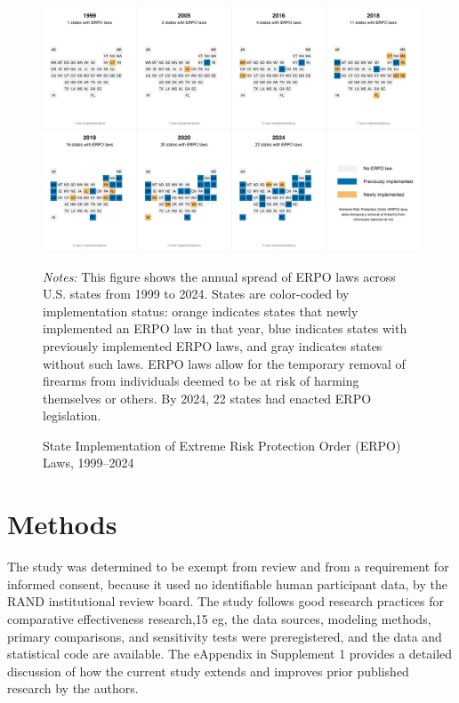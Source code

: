 \documentclass[,ijds,nonblindrev]{informs}
\begin{document}
\begin{figure}[t] 
\centering
\includegraphics[width=\textwidth]{../erpo_laws_spread.png}
\caption{State Implementation of Extreme Risk Protection Order (ERPO) Laws, 1999–2024}  
\label{fig:erpo_map}
\begin{tablenotes}
\item \footnotesize{\textit{Notes:} This figure shows the annual spread of ERPO laws across U.S. states from 1999 to 2024. States are color-coded by implementation status: orange indicates states that newly implemented an ERPO law in that year, blue indicates states with previously implemented ERPO laws, and gray indicates states without such laws. ERPO laws allow for the temporary removal of firearms from individuals deemed to be at risk of harming themselves or others. By 2024, 22 states had enacted ERPO legislation.}
\end{tablenotes}
\end{figure}

\section{Methods}\label{methods}

The study was determined to be exempt from review and from a requirement
for informed consent, because it used no identifiable human participant
data, by the RAND institutional review board. The study follows good
research practices for comparative effectiveness research,15 eg, the
data sources, modeling methods, primary comparisons, and sensitivity
tests were preregistered, and the data and statistical code are
available. The eAppendix in Supplement 1 provides a detailed discussion
of how the current study extends and improves prior published research
by the authors.
\end{document}

